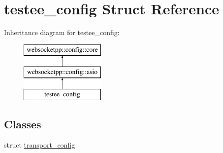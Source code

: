 \hypertarget{structtestee__config}{}\section{testee\+\_\+config Struct Reference}
\label{structtestee__config}
Inheritance diagram for testee\+\_\+config\+:\begin{figure}[H]
\begin{center}
\leavevmode
\includegraphics[height=3.000000cm]{structtestee__config}
\end{center}
\end{figure}
\subsection*{Classes}
\begin{DoxyCompactItemize}
\item 
struct \hyperlink{structtestee__config_1_1transport__config}{transport\+\_\+config}
\end{DoxyCompactItemize}
